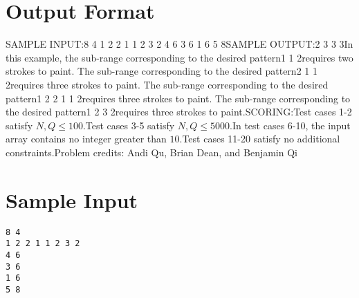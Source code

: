 \documentclass[12pt]{article}
\begin{document}
\section*{Output Format}
SAMPLE INPUT:8 4
1 2 2 1 1 2 3 2
4 6
3 6
1 6
5 8SAMPLE OUTPUT:2
3
3
3In this example, the sub-range corresponding to the desired pattern1 1 2requires two strokes to paint. The sub-range corresponding to the desired
pattern2 1 1 2requires three strokes to paint.  The sub-range corresponding to the desired
pattern1 2 2 1 1 2requires three strokes to paint. The sub-range corresponding to the desired
pattern1 2 3 2requires three strokes to paint.SCORING:Test cases 1-2 satisfy $N,Q\le 100$.Test cases 3-5 satisfy $N,Q\le 5000$.In test cases 6-10, the input array contains no integer greater than $10$.Test cases 11-20 satisfy no additional constraints.Problem credits: Andi Qu, Brian Dean, and Benjamin Qi

\section*{Sample Input}
\begin{verbatim}
8 4
1 2 2 1 1 2 3 2
4 6
3 6
1 6
5 8
\end{verbatim}
\end{document}
